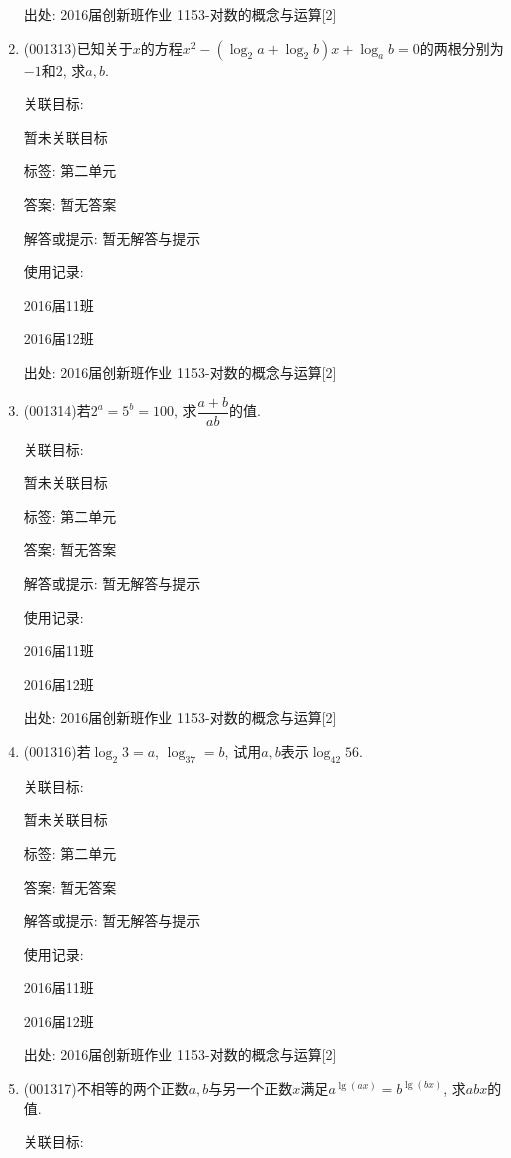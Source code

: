 \documentclass[10pt,a4paper]{article}
\begin{document}
\begin{enumerate}[1.]
出处: 2016届创新班作业	1153-对数的概念与运算[2]
\item { (001313)}已知关于$x$的方程$x^2-(\log_2 a+\log_2 b)x+\log_a b=0$的两根分别为$-1$和$2$, 求$a,b$.


关联目标:

暂未关联目标



标签: 第二单元

答案: 暂无答案

解答或提示: 暂无解答与提示

使用记录:

2016届11班	

2016届12班	


出处: 2016届创新班作业	1153-对数的概念与运算[2]
\item { (001314)}若$2^a=5^b=100$, 求$\dfrac{a+b}{ab}$的值.


关联目标:

暂未关联目标



标签: 第二单元

答案: 暂无答案

解答或提示: 暂无解答与提示

使用记录:

2016届11班	

2016届12班	


出处: 2016届创新班作业	1153-对数的概念与运算[2]
\item { (001316)}若$\log_2 3=a$, $\log_37=b$, 试用$a,b$表示$\log_{42} 56$.


关联目标:

暂未关联目标



标签: 第二单元

答案: 暂无答案

解答或提示: 暂无解答与提示

使用记录:

2016届11班	

2016届12班	


出处: 2016届创新班作业	1153-对数的概念与运算[2]
\item { (001317)}不相等的两个正数$a,b$与另一个正数$x$满足$a^{\lg(ax)}=b^{\lg(bx)}$, 求$abx$的值.


关联目标:


\end{enumerate}
\end{document}
